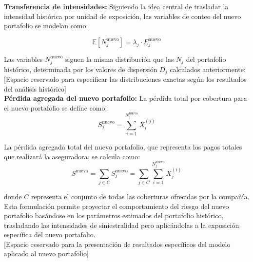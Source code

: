\textbf{Transferencia de intensidades:} Siguiendo la idea central de trasladar la intensidad histórica por unidad de exposición, las variables de conteo del nuevo portafolio se modelan como:

\begin{equation*}
\mathbb{E}[N_j^{\text{nuevo}}] = \lambda_j \cdot E_j^{\text{nuevo}}
\end{equation*}

Las variables $N_j^{\text{nuevo}}$ siguen la misma distribución que las $N_j$ del portafolio histórico, determinada por los valores de dispersión $D_j$ calculados anteriormente:\\

[Espacio reservado para especificar las distribuciones exactas según los resultados del análisis histórico]\\

\textbf{Pérdida agregada del nuevo portafolio:} La pérdida total por cobertura para el nuevo portafolio se define como:
\begin{equation*}
S_j^{\text{nuevo}} = \sum_{i=1}^{N_j^{\text{nuevo}}} X_i^{(j)}
\end{equation*}

La pérdida agregada total del nuevo portafolio, que representa los pagos totales que realizará la aseguradora, se calcula como:
\begin{equation}
S^{\text{nuevo}} = \sum_{j \in C} S_j^{\text{nuevo}} = \sum_{j \in C} \sum_{i=1}^{N_j^{\text{nuevo}}} X_j^{(i)}
\end{equation}

donde $C$ representa el conjunto de todas las coberturas ofrecidas por la compañía.\\

Esta formulación permite proyectar el comportamiento del riesgo del nuevo portafolio basándose en los parámetros estimados del portafolio histórico, trasladando las intensidades de siniestralidad pero aplicándolas a la exposición específica del nuevo portafolio.\\

[Espacio reservado para la presentación de resultados específicos del modelo aplicado al nuevo portafolio]